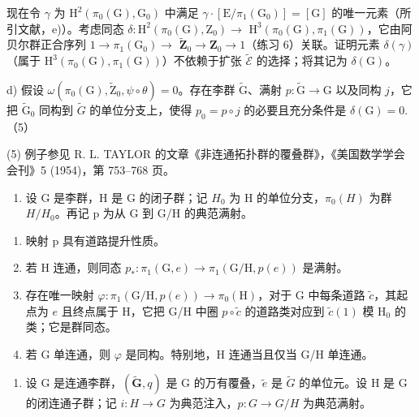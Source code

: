 现在令 \(\gamma\) 为 \(\mathrm{H}^2 (\pi_0(\mathrm{G}),\mathrm{G}_0)\) 中满足 \(\gamma \cdot [\mathrm{E} / \pi_1(\mathrm{G}_0)] = [\mathrm{G}]\) 的唯一元素（所引文献，e)）。考虑同态 \(\delta \colon \mathrm{H}^2 (\pi_0(\mathrm{G}),\mathrm{Z}_0)\to\) \(\mathrm{H}^3 (\pi_0(\mathrm{G}),\pi_1(\mathrm{G}))\)，它由阿贝尔群正合序列 \(1\to \pi_1(\mathrm{G}_0)\to\) \(\widetilde{\mathbf{Z}}_0\to \mathbf{Z}_0\to 1\)（练习 6）关联。证明元素 \(\delta (\gamma)\)（属于 \(\mathrm{H}^3 (\pi_0(\mathrm{G}),\pi_1(\mathrm{G}))\)）不依赖于扩张 \(\widetilde{\mathcal{E}}\) 的选择；将其记为 \(\delta (\mathrm{G})\)。

d) 假设 \(\omega (\pi_0(\mathrm{G}),\widetilde{\mathrm{Z}}_0,\psi \circ \theta) = 0\)。存在李群 \(\widetilde{\mathrm{G}}\)、满射 \(p\colon \widetilde{\mathrm{G}}\to \mathrm{G}\) 以及同构 \(j\)，它把 \(\widetilde{\mathrm{G}}_0\) 同构到 \(\widetilde{G}\) 的单位分支上，使得 \(p_{0}=p\circ j\) 的必要且充分条件是 \(\delta(\mathrm{G})=0.\)（5）

(5) 例子参见 R. L. TAYLOR 的文章《非连通拓扑群的覆叠群》，《美国数学学会会刊》5 (1954)，第 753–768 页。

\begin{enumerate}
\def\labelenumi{\arabic{enumi})}
\setcounter{enumi}{7}
\tightlist
\item
  设 G 是李群，H 是 G 的闭子群；记 \(H_{0}\) 为 H 的单位分支，\(\pi_{0}(H)\) 为群 \(H/H_{0}\)。再记 p 为从 G 到 G/H 的典范满射。
\end{enumerate}

\begin{enumerate}
\def\labelenumi{\alph{enumi})}
\item
  映射 p 具有道路提升性质。
\item
  若 H 连通，则同态 \(p_{*}\colon\pi_{1}(\mathrm{G},e)\to\pi_{1}(\mathrm{G}/\mathrm{H},p(e))\) 是满射。
\item
  存在唯一映射 \(\varphi\colon\pi_{1}(\mathrm{G/H},p(e))\to\pi_{0}(\mathrm{H})\)，对于 G 中每条道路 \(\widetilde{c}\)，其起点为 \(e\) 且终点属于 H，它把 G/H 中圈 \(p\circ\widetilde{c}\) 的道路类对应到 \(\widetilde{c}(1)\) 模 \(\mathrm{H}_{0}\) 的类；它是群同态。
\item
  若 G 单连通，则 \(\varphi\) 是同构。特别地，H 连通当且仅当 G/H 单连通。
\end{enumerate}

\begin{enumerate}
\def\labelenumi{\arabic{enumi})}
\setcounter{enumi}{8}
\tightlist
\item
  设 G 是连通李群，\((\widetilde{\mathbf{G}}, q)\) 是 G 的万有覆叠，\(\widetilde{e}\) 是 \(\widetilde{G}\) 的单位元。设 H 是 G 的闭连通子群；记 \(i: H \to G\) 为典范注入，\(p: G \to G/H\) 为典范满射。
\end{enumerate}

